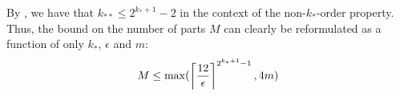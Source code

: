     \begin{remark}
        By , we have that $k_{**} \leq 2^{k_* + 1}-2$ in the context of the non-$k_*$-order
        property.
        Thus, the bound on the number of parts $M$ can clearly be reformulated as a function of only $k_*$, $\epsilon$ and $m$:
        \[
            M \leq \max ( \left\lceil \frac{12}{\epsilon} \right\rceil^{2^{k_* + 1}-1}, 4m )
        \]
    \end{remark}




